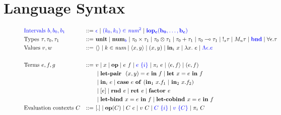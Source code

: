 \section{Language Syntax}

\begin{figure}[tbp]
  \begin{alignat*}{3}
    &\bnd{\text{Intervals } b, b_0, b_1} &::=~ &\bnd{\epsilon}
         \mid \bnd{(k_0, k_1) \in \textit{num}^{2}}
         \mid \bnd{\mathbf{iop_c(b_0, \ldots, b_c)}} \\
         &\text{Types } \tau, \tau_0, \tau_1 &::=~ &\mathbf{unit}
         \mid \num_{\bnd{b}}
         \mid \tau_0 \times \tau_1
         \mid \tau_0 \otimes \tau_1
         \mid \tau_0 + \tau_1
         \mid \tau_0 \multimap \tau_1
         \mid {\bang{s} \tau}
         \mid {M_u \tau}
         \mid \bnd{\textbf{bnd}}
         \mid \forall \epsilon . \tau
         \\
         &\text{Values } v, w \ &::=~ &\langle \rangle
         \mid k \in \textit{num}
         \mid \langle x,y \rangle 
         \mid (x, y)
         \mid \tin_i \ x
         \mid \lambda x.~e
         \mid \bnd{\Lambda \epsilon . e} \\
         \\
         &\text{Terms } e, f, g &::=~ &v
         \mid x
         \mid \mathbf{op}
         \mid e~f
         \mid \bnd{e~\{i\}}
         \mid {\pi}_i\ e
         \mid \langle e,f \rangle 
         \mid (e, f) \\
         & & & \mid \letpair \ (x,y) = e \ \tin \ f
         \mid \letassign x  = e \ \tin \ f \\
         & & & \mid \tin_i \ e
         \mid 
          \mathbf{case} \ e \ \mathbf{of} \ (\tin_1 \ x.f_1 \ | \ \tin_2 \ x.f_2) \\
         & & &
         \mid [e]
         \mid \rnd e
         \mid {\ret e} 
         \mid \factor e \\
         & & & 
         \mid {\letbind x = e \ \tin \ f}
         \mid \letcobind x = e \ \tin \ f
         \\
         &\text{Evaluation contexts } C &::=~ &[.] 
         \mid \mathbf{op}(C) 
         \mid C~e 
         \mid v~C 
         \mid \bnd{C~\{i\}}
         \mid \bnd{v~\{C\}}
         \mid \pi_i~C \\

\end{alignat*}
\end{figure}
